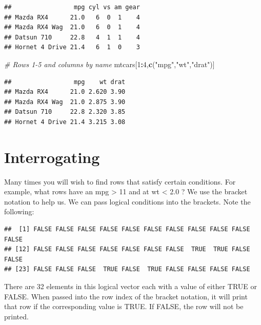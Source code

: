 \documentclass[]{book}
\newenvironment{Shaded}{\begin{snugshade}}{\end{snugshade}}
\newcommand{\KeywordTok}[1]{\textcolor[rgb]{0.13,0.29,0.53}{\textbf{#1}}}
\newcommand{\DecValTok}[1]{\textcolor[rgb]{0.00,0.00,0.81}{#1}}
\newcommand{\FloatTok}[1]{\textcolor[rgb]{0.00,0.00,0.81}{#1}}
\newcommand{\StringTok}[1]{\textcolor[rgb]{0.31,0.60,0.02}{#1}}
\newcommand{\CommentTok}[1]{\textcolor[rgb]{0.56,0.35,0.01}{\textit{#1}}}
\newcommand{\OperatorTok}[1]{\textcolor[rgb]{0.81,0.36,0.00}{\textbf{#1}}}
\newcommand{\NormalTok}[1]{#1}
\begin{document}
\begin{verbatim}
##                 mpg cyl vs am gear
## Mazda RX4      21.0   6  0  1    4
## Mazda RX4 Wag  21.0   6  0  1    4
## Datsun 710     22.8   4  1  1    4
## Hornet 4 Drive 21.4   6  1  0    3
\end{verbatim}

\begin{Shaded}
\begin{Highlighting}[]
\CommentTok{# Rows 1-5 and columns by name}
\NormalTok{mtcars[}\DecValTok{1}\OperatorTok{:}\DecValTok{4}\NormalTok{,}\KeywordTok{c}\NormalTok{(}\StringTok{"mpg"}\NormalTok{,}\StringTok{"wt"}\NormalTok{,}\StringTok{"drat"}\NormalTok{)]}
\end{Highlighting}
\end{Shaded}

\begin{verbatim}
##                 mpg    wt drat
## Mazda RX4      21.0 2.620 3.90
## Mazda RX4 Wag  21.0 2.875 3.90
## Datsun 710     22.8 2.320 3.85
## Hornet 4 Drive 21.4 3.215 3.08
\end{verbatim}

\section{Interrogating}\label{interrogating}

Many times you will wish to find rows that satisfy certain conditions.
For example, what rows have an mpg \textgreater{} 11 and at wt
\textless{} 2.0 ? We use the bracket notation to help us. We can pass
logical conditions into the brackets. Note the following:

\begin{Shaded}
\end{Shaded}

\begin{verbatim}
##  [1] FALSE FALSE FALSE FALSE FALSE FALSE FALSE FALSE FALSE FALSE FALSE
## [12] FALSE FALSE FALSE FALSE FALSE FALSE FALSE  TRUE  TRUE FALSE FALSE
## [23] FALSE FALSE FALSE  TRUE FALSE  TRUE FALSE FALSE FALSE FALSE
\end{verbatim}

There are 32 elements in this logical vector each with a value of either
TRUE or FALSE. When passed into the row index of the bracket notation,
it will print that row if the corresponding value is TRUE. If FALSE, the
row will not be printed.
\end{document}

